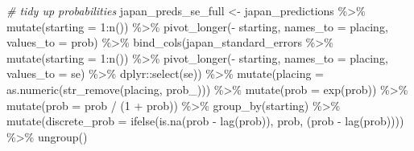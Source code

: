 \documentclass[
]{book}
\newenvironment{Shaded}{\begin{snugshade}}{\end{snugshade}}
\newcommand{\AttributeTok}[1]{\textcolor[rgb]{0.77,0.63,0.00}{#1}}
\newcommand{\CommentTok}[1]{\textcolor[rgb]{0.56,0.35,0.01}{\textit{#1}}}
\newcommand{\DecValTok}[1]{\textcolor[rgb]{0.00,0.00,0.81}{#1}}
\newcommand{\FunctionTok}[1]{\textcolor[rgb]{0.00,0.00,0.00}{#1}}
\newcommand{\NormalTok}[1]{#1}
\newcommand{\OtherTok}[1]{\textcolor[rgb]{0.56,0.35,0.01}{#1}}
\newcommand{\SpecialCharTok}[1]{\textcolor[rgb]{0.00,0.00,0.00}{#1}}
\newcommand{\StringTok}[1]{\textcolor[rgb]{0.31,0.60,0.02}{#1}}
\begin{document}
\begin{Shaded}
\begin{Highlighting}[]
\CommentTok{\# tidy up probabilities}
\NormalTok{japan\_preds\_se\_full }\OtherTok{\textless{}{-}}\NormalTok{ japan\_predictions }\SpecialCharTok{\%\textgreater{}\%}
  \FunctionTok{mutate}\NormalTok{(}\AttributeTok{starting =} \DecValTok{1}\SpecialCharTok{:}\FunctionTok{n}\NormalTok{()) }\SpecialCharTok{\%\textgreater{}\%}
  \FunctionTok{pivot\_longer}\NormalTok{(}\SpecialCharTok{{-}}\NormalTok{ starting, }\AttributeTok{names\_to =} \StringTok{\textquotesingle{}placing\textquotesingle{}}\NormalTok{, }\AttributeTok{values\_to =} \StringTok{\textquotesingle{}prob\textquotesingle{}}\NormalTok{) }\SpecialCharTok{\%\textgreater{}\%} 
  \FunctionTok{bind\_cols}\NormalTok{(japan\_standard\_errors }\SpecialCharTok{\%\textgreater{}\%} \FunctionTok{mutate}\NormalTok{(}\AttributeTok{starting =} \DecValTok{1}\SpecialCharTok{:}\FunctionTok{n}\NormalTok{()) }\SpecialCharTok{\%\textgreater{}\%}
  \FunctionTok{pivot\_longer}\NormalTok{(}\SpecialCharTok{{-}}\NormalTok{ starting, }\AttributeTok{names\_to =} \StringTok{\textquotesingle{}placing\textquotesingle{}}\NormalTok{, }\AttributeTok{values\_to =} \StringTok{\textquotesingle{}se\textquotesingle{}}\NormalTok{) }\SpecialCharTok{\%\textgreater{}\%}
\NormalTok{    dplyr}\SpecialCharTok{::}\FunctionTok{select}\NormalTok{(se)) }\SpecialCharTok{\%\textgreater{}\%}
  \FunctionTok{mutate}\NormalTok{(}\AttributeTok{placing =} \FunctionTok{as.numeric}\NormalTok{(}\FunctionTok{str\_remove}\NormalTok{(placing, }\StringTok{\textquotesingle{}prob\_\textquotesingle{}}\NormalTok{))) }\SpecialCharTok{\%\textgreater{}\%}
  \FunctionTok{mutate}\NormalTok{(}\AttributeTok{prob =} \FunctionTok{exp}\NormalTok{(prob)) }\SpecialCharTok{\%\textgreater{}\%}
  \FunctionTok{mutate}\NormalTok{(}\AttributeTok{prob =}\NormalTok{ prob }\SpecialCharTok{/}\NormalTok{ (}\DecValTok{1} \SpecialCharTok{+}\NormalTok{ prob)) }\SpecialCharTok{\%\textgreater{}\%}
  \FunctionTok{group\_by}\NormalTok{(starting) }\SpecialCharTok{\%\textgreater{}\%} 
  \FunctionTok{mutate}\NormalTok{(}\AttributeTok{discrete\_prob =} \FunctionTok{ifelse}\NormalTok{(}\FunctionTok{is.na}\NormalTok{(prob }\SpecialCharTok{{-}} \FunctionTok{lag}\NormalTok{(prob)), prob, (prob }\SpecialCharTok{{-}} \FunctionTok{lag}\NormalTok{(prob)))) }\SpecialCharTok{\%\textgreater{}\%}
  \FunctionTok{ungroup}\NormalTok{()}


\end{Highlighting}
\end{Shaded}
\end{document}
